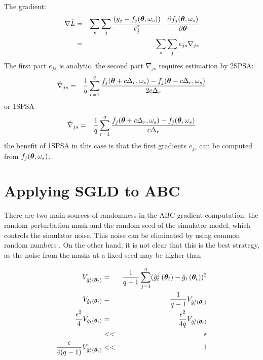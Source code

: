 \documentclass[]{article}
\begin{document}
The gradient:
\begin{eqnarray} 
  \nabla \hat{L} & = & \sum_s \sum_j \frac{\lp y_j - f_j(\thetav, \omega_s)\rp}{\epsilon_j^2} \cdot \frac{\partial f_j(\thetav, \omega_s)}{\partial \thetav} \\
                 & = & \sum_s \sum_j e_{js} \nabla_{js}
\end{eqnarray}
The first part $e_{js}$ is analytic, the second part $\nabla_{js}$ requires estimation by 2SPSA:
\begin{eqnarray} 
  \hat{ \nabla }_{js}  & = & \frac{1}{q} \sum_{r=1}^q \frac{f_j(\thetav + c \Delta_r , \omega_s) - f_j(\thetav - c \Delta_r , \omega_s)}{2 c \Delta_r}
\end{eqnarray}
or 1SPSA
\begin{eqnarray} 
  \hat{ \nabla }_{js} & = & \frac{1}{q} \sum_{r=1}^q \frac{f_j(\thetav + c \Delta_r , \omega_s) - f_j(\thetav, \omega_s)}{c \Delta_r}
\end{eqnarray}
the benefit of 1SPSA in this case is that the first gradients  $e_{js}$ can be computed from $f_j(\thetav, \omega_s)$.



\section{Applying SGLD to ABC}

There are two main sources of randomness in the ABC gradient computation: the random perturbation mask and the random seed of the simulator model, which controls the simulator noise.  This noise can be eliminated by using common random numbers \cite{spall-crn}.  On the other hand, it is not clear that this is the best strategy, as the noise from the masks at a fixed seed may be higher than   

\begin{eqnarray}
  V_{\gradestimaterepeat{t}{\thetav_t}{j}} & = & \frac{1}{q-1} \sum_{j=1}^q (\gradestimaterepeat{t}{\thetav_t}{j} - \gradestimate{t}{\thetav_t})^2 \\
  V_{\gradestimate{t}{\thetav_t}} & = & \frac{1}{q-1} V_{\gradestimaterepeat{t}{\thetav_t}{j}} \\
  \frac{\epsilon^2}{4 }V_{\gradestimate{t}{\thetav_t}} & = & \frac{\epsilon^2}{4 q }V_{\gradestimaterepeat{t}{\thetav_t}{j}} \\
                                                       & << & \epsilon \\
                    \frac{\epsilon}{4 (q-1) }V_{\gradestimaterepeat{t}{\thetav_t}{j}}  & << & 1                                  
\end{eqnarray}
\end{document}
